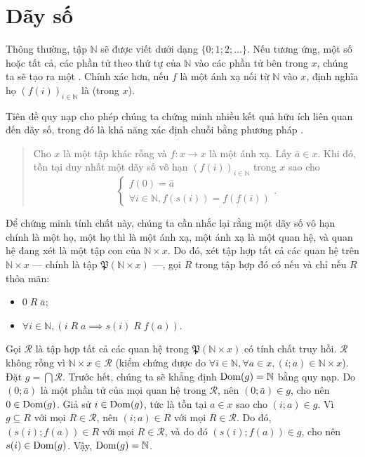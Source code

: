 \section{Dãy số}

Thông thường, tập $\mathbb{N}$ sẽ được viết dưới dạng $\{0; 1; 2; \dots\}$. Nếu tương ứng, một số hoặc tất cả, các phần tử theo thứ tự của $\mathbb{N}$ vào các phần tử bên trong $x$, chúng ta sẽ tạo ra một . Chính xác hơn, nếu $f$ là một ánh xạ nối từ $\mathbb{N}$ vào $x$, định nghĩa họ $(f(i))_{i \in \mathbb{N}}$ là  (trong $x$). 

Tiên đề quy nạp cho phép chúng ta chứng minh nhiều kết quả hữu ích liên quan đến dãy số, trong đó là khả năng xác định chuỗi bằng phương pháp .

\begin{quotation}
    Cho $x$ là một tập khác rỗng và $f: x \to x$ là một ánh xạ. Lấy $\bar{a} \in x$. Khi đó, tồn tại duy nhất một dãy số vô hạn $(f(i))_{i \in \mathbb{N}}$ trong $x$ sao cho \begin{equation*}
        \begin{cases}
            f(0) = \bar{a}\\
            \forall i \in \mathbb{N}, f(s(i)) = f(f(i))
        \end{cases}.
    \end{equation*}
\end{quotation}

Để chứng minh tính chất này, chúng ta cần nhắc lại rằng một dãy số vô hạn chính là một họ, một họ thì là một ánh xạ, một ánh xạ là một quan hệ, và quan hệ đang xét là một tập con của $\mathbb{N} \times x$. Do đó, xét tập hợp tất cả các quan hệ trên $\mathbb{N} \times x$ --- chính là tập $\mathfrak{P}(\mathbb{N} \times x)$ ---, gọi $R$ trong tập hợp đó có  nếu và chỉ nếu $R$ thỏa mãn:
\begin{itemize}
    \item $0\;R\;\bar{a}$;
    \item $\forall i \in \mathbb{N}, \left(i\;R\;a \implies s(i)\;R\;f(a)\right)$.
\end{itemize}

Gọi $\mathcal{R}$ là tập hợp tất cả các quan hệ trong $\mathfrak{P}(\mathbb{N} \times x)$ có tính chất truy hồi. $\mathcal{R}$ không rỗng vì $\mathbb{N} \times x \in \mathcal{R}$ (kiểm chứng được do $\forall i \in \mathbb{N}, \forall a \in x, (i; a) \in \mathbb{N} \times x$). Đặt $g = \bigcap \mathcal{R}$. Trước hết, chúng ta sẽ khẳng định $\operatorname{Dom}(g) = \mathbb{N}$ bằng quy nạp. Do $\left(0; \bar{a}\right)$ là một phần tử của mọi quan hệ trong $\mathcal{R}$, nên $\left(0; \bar{a}\right) \in g$, cho nên $0 \in \operatorname{Dom}(g)$. Giả sử $i \in \operatorname{Dom}(g)$, tức là tồn tại $a \in x$ sao cho $(i; a) \in g$. Vì $g \subseteq R$ với mọi $R \in \mathcal{R}$, nên $(i; a) \in R$ với mọi $R \in \mathcal{R}$. Do đó, $(s(i); f(a)) \in R$ với mọi $R \in \mathcal{R}$, và do đó $(s(i); f(a)) \in g$, cho nên $s(i) \in \operatorname{Dom}(g)$. Vậy, $\operatorname{Dom}(g) = \mathbb{N}$.

